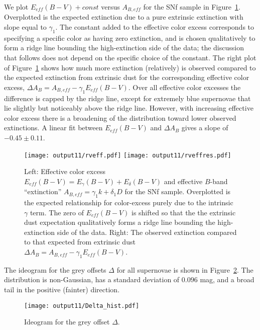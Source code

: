 \documentclass{aastex}   	%
\begin{document}
We plot $E_{eff}(B-V) + const$ versus
$A_{B, eff}$ for the SNf sample in Figure~\ref{rveff:fig}.
Overplotted is the expected extinction due to a pure extrinsic extinction with slope equal to $\gamma_1$.
The constant added to the effective color excess
corresponds to specifying a specific color as having zero extinction, and is chosen  qualitatively to form a ridge line 
bounding the high-extinction side of the data; the discussion that follows does not depend on the specific choice of the constant.
The right plot of Figure~\ref{rveff:fig} shows  how much more extinction (relatively) is
observed compared to the expected extinction from extrinsic dust for the corresponding effective color excess,
 $\Delta A_B =  A_{B,eff}- \gamma_1 E_{eff}(B-V)$.
Over all effective color excesses the difference is capped by the ridge line, except for extremely
blue supernovae that lie slightly but noticeably above the ridge line.
However, with increasing effective color excess there is a broadening of the distribution toward lower observed extinctions.
A linear fit between $E_{eff}(B-V)$  and $\Delta A_B$ gives a slope of $-0.45 \pm 0.11$.

\begin{figure}[htbp] %
   \centering
   \texttt{[image: output11/rveff.pdf]}
   \texttt{[image: output11/rveffres.pdf]}
   \caption{Left: Effective color excess $E_{eff}(B-V) = E_\gamma(B-V) + E_\delta(B-V)$ and effective $B$-band ``extinction''
$A_{B, eff} = \gamma_1 k + \delta_1D$ for the SNf sample.  Overplotted is the expected relationship for color-excess
purely due to the intrinsic $\gamma$ term.   The zero of  $E_{eff}(B-V)$  is shifted so that the  the extrinsic dust expectation qualitatively forms a ridge line
bounding the high-extinction side of the data.
Right:  The observed extinction compared to that expected  from extrinsic dust $\Delta A_B =  A_{B,eff}- \gamma_1 E_{eff}(B-V)$.
   \label{rveff:fig}}
\end{figure}


The ideogram for the grey offsets $\Delta$ for all supernovae is shown in Figure~\ref{hist:fig}.  The distribution is non-Gaussian, 
has a standard deviation of $0.096$ mag, and a broad tail in the positive (fainter) direction.
\begin{figure}[htbp] %
   \centering
   \texttt{[image: output11/Delta\_hist.pdf]} 
   \caption{Ideogram for the grey offset $\Delta$.
   \label{hist:fig}}
\end{figure}
\end{document}
